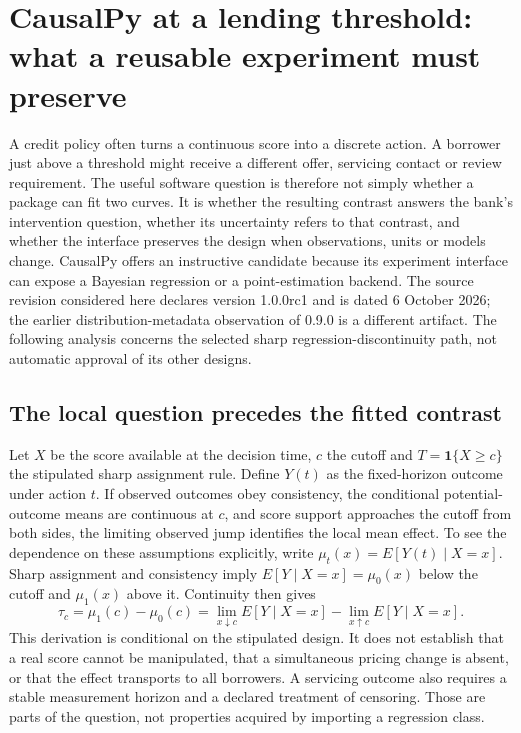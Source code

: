 \section{CausalPy at a lending threshold: what a reusable experiment must preserve}
\label{exec14:causalpy-contract}

A credit policy often turns a continuous score into a discrete action. A borrower
just above a threshold might receive a different offer, servicing contact or
review requirement. The useful software question is therefore not simply whether
a package can fit two curves. It is whether the resulting contrast answers the
bank's intervention question, whether its uncertainty refers to that contrast,
and whether the interface preserves the design when observations, units or models
change. CausalPy offers an instructive candidate because its experiment interface
can expose a Bayesian regression or a point-estimation backend. The source
revision considered here declares version 1.0.0rc1 and is dated 6 October 2026;
the earlier distribution-metadata observation of 0.9.0 is a different artifact.
The following analysis concerns the selected sharp regression-discontinuity
path, not automatic approval of its other designs.\citep{exec14_causalpy_primary}

\subsection{The local question precedes the fitted contrast}

Let $X$ be the score available at the decision time, $c$ the cutoff and
$T=\mathbf{1}\{X\geq c\}$ the stipulated sharp assignment rule. Define $Y(t)$ as
the fixed-horizon outcome under action $t$. If observed outcomes obey consistency,
the conditional potential-outcome means are continuous at $c$, and score support
approaches the cutoff from both sides, the limiting observed jump identifies
the local mean effect. To see the dependence on these assumptions explicitly,
write $\mu_t(x)=E[Y(t)\mid X=x]$. Sharp assignment and consistency imply
$E[Y\mid X=x]=\mu_0(x)$ below the cutoff and $\mu_1(x)$ above it. Continuity
then gives
\[
 \tau_c=\mu_1(c)-\mu_0(c)
 =\lim_{x\downarrow c}E[Y\mid X=x]-\lim_{x\uparrow c}E[Y\mid X=x].
\]
This derivation is conditional on the stipulated design. It does not establish
that a real score cannot be manipulated, that a simultaneous pricing change is
absent, or that the effect transports to all borrowers. A servicing outcome also
requires a stable measurement horizon and a declared treatment of censoring.
Those are parts of the question, not properties acquired by importing a regression
class.\citep{exec14_causalpy_exact,exec14_causalpy_decision}

